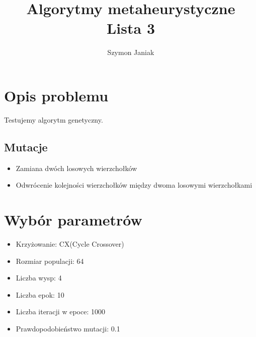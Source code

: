 \documentclass{article}
\begin{document}
\title{Algorytmy metaheurystyczne\\
\large Lista 3}
\author{Szymon Janiak}

\maketitle

\section*{Opis problemu}
    Testujemy algorytm genetyczny.

\subsection{Mutacje}
\begin{itemize}
    \item Zamiana dwóch losowych wierzchołków
    \item Odwrócenie kolejności wierzchołków między dwoma losowymi wierzchołkami
\end{itemize}

\section{Wybór parametrów}
\begin{itemize}
    \item Krzyżowanie: CX(Cycle Crossover)
    \item Rozmiar populacji: 64
    \item Liczba wysp: 4
    \item Liczba epok: 10
    \item Liczba iteracji w epoce: 1000
    \item Prawdopodobieństwo mutacji: 0.1
\end{itemize}
\end{document}

